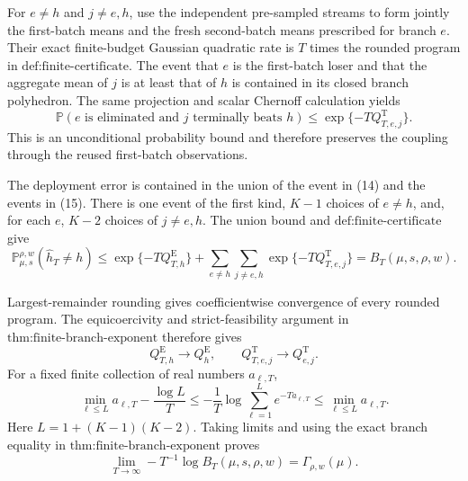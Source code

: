 For \(e\ne h\) and \(j\ne e,h\), use the independent pre-sampled streams to form jointly the first-batch means and the fresh second-batch means prescribed for branch \(e\). Their exact finite-budget Gaussian quadratic rate is \(T\) times the rounded program in \(\text{def:finite-certificate}\). The event that \(e\) is the first-batch loser and that the aggregate mean of \(j\) is at least that of \(h\) is contained in its closed branch polyhedron. The same projection and scalar Chernoff calculation yields
\[
 \mathbb P(e\text{ is eliminated and }j\text{ terminally beats }h)
 \leq \exp\{-TQ_{T,e,j}^{\mathrm T}\}. \tag{15}
\]
This is an unconditional probability bound and therefore preserves the coupling through the reused first-batch observations.

The deployment error is contained in the union of the event in (14) and the events in (15). There is one event of the first kind, \(K-1\) choices of \(e\ne h\), and, for each \(e\), \(K-2\) choices of \(j\ne e,h\). The union bound and \(\text{def:finite-certificate}\) give
\[
 \mathbb P_{\mu,s}^{\rho,w}(\widehat h_T\ne h)
 \leq \exp\{-TQ_{T,h}^{\mathrm E}\}
 +\sum_{e\ne h}\sum_{j\ne e,h}\exp\{-TQ_{T,e,j}^{\mathrm T}\}
 =B_T(\mu,s,\rho,w).
\]

Largest-remainder rounding gives coefficientwise convergence of every rounded program. The equicoercivity and strict-feasibility argument in \(\text{thm:finite-branch-exponent}\) therefore gives
\[
 Q_{T,h}^{\mathrm E}\longrightarrow Q_h^{\mathrm E},
 \qquad
 Q_{T,e,j}^{\mathrm T}\longrightarrow Q_{e,j}^{\mathrm T}.
\]
For a fixed finite collection of real numbers \(a_{\ell,T}\),
\[
 \min_{\ell\leq L}a_{\ell,T}-\frac{\log L}{T}
 \leq -\frac1T\log\sum_{\ell=1}^L e^{-Ta_{\ell,T}}
 \leq \min_{\ell\leq L}a_{\ell,T}.
\]
Here \(L=1+(K-1)(K-2)\). Taking limits and using the exact branch equality in \(\text{thm:finite-branch-exponent}\) proves
\[
 \lim_{T\to\infty}-T^{-1}\log B_T(\mu,s,\rho,w)
 =\Gamma_{\rho,w}(\mu).
\]

